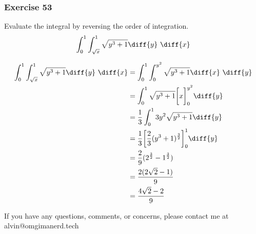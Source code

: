 \documentclass[letterpaper, 12pt]{math}
\begin{document}
\subsubsection*{Exercise 53​}
Evaluate the integral by reversing the order of integration.
\[ \int_{0}^{1}\int_{\sqrt{x}}^{1}\sqrt{y^3+1}\diff{y}~\diff{x} \]
\begin{center}
\end{center}
\begin{align*}
  \int_{0}^{1}\int_{\sqrt{x}}^{1}\sqrt{y^3+1}\diff{y}~\diff{x} &=
    \int_{0}^{1}\int_{0}^{y^2}\sqrt{y^3+1}\diff{x}~\diff{y} \\
  &= \int_{0}^{1}\sqrt{y^3+1}\bigg[x\bigg]_{0}^{y^2}\diff{y} \\
  &= \frac{1}{3}\int_{0}^{1}3y^2\sqrt{y^3+1}\diff{y} \\
  &= \frac{1}{3}\bigg[\frac{2}{3}(y^3+1)^{\frac{3}{2}}\bigg]_{0}^{1}\diff{y} \\
  &= \frac{2}{9}(2^{\frac{3}{2}}-1^{\frac{3}{2}}) \\
  &= \frac{2(2\sqrt{2}-1)}{9} \\
  &= \frac{4\sqrt{2}-2}{9}
\end{align*}

\begin{center}
  If you have any questions, comments, or concerns, please contact me at
  alvin@omgimanerd.tech
\end{center}
\end{document}
